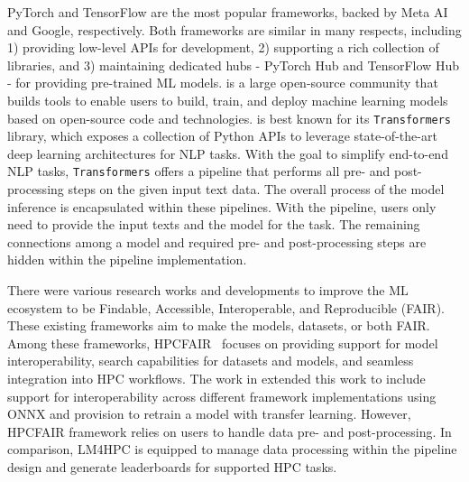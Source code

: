 PyTorch and TensorFlow are the most popular frameworks, backed by Meta AI and Google, respectively.
Both frameworks are similar in many respects, including 1) providing low-level APIs for development, 2) supporting a rich collection of libraries, and 3) maintaining dedicated hubs - PyTorch Hub and TensorFlow Hub - for providing pre-trained ML models. 
\face is a large open-source community that builds tools to enable users to build, train, and deploy machine learning models based on open-source code and technologies.
\face is best known for its \texttt{Transformers} library, which exposes a collection of Python APIs to leverage state-of-the-art deep learning architectures for NLP tasks. 
With the goal to simplify end-to-end NLP tasks, \face \texttt{Transformers} offers a pipeline that performs all pre- and post-processing steps on the given input text data. The overall process of the model inference is encapsulated within these pipelines. With the pipeline, users only need to provide the input texts and the model for the task.  The remaining connections among a model and required pre- and post-processing steps are hidden within the pipeline implementation.

There were various research works and developments to improve the ML ecosystem to be Findable, Accessible, Interoperable, and Reproducible (FAIR).  These existing frameworks aim to make the models, datasets, or both FAIR.  Among these frameworks, HPCFAIR~\cite{verma2021hpcfair} focuses on providing support for model interoperability, search capabilities for datasets and models, and seamless integration into HPC workflows.  The work in \cite{yu2022seamless} extended this work to include support for interoperability across different framework implementations using ONNX and provision to retrain a model with transfer learning.
However, HPCFAIR framework relies on users to handle data pre- and post-processing. In comparison, LM4HPC is equipped to manage data processing within the pipeline design and generate leaderboards for supported HPC tasks. 

